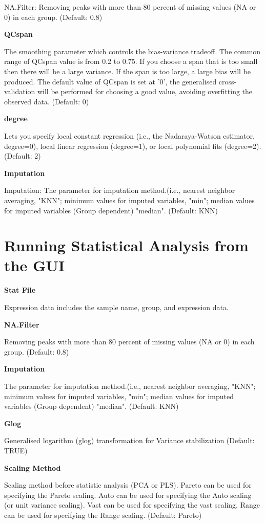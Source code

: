 \documentclass[english]{article}
\begin{document}
 NA.Filter: Removing peaks with more than 80 percent of missing values
 (NA or 0) in each group. (Default: 0.8) 


\textbf{QCspan}


The smoothing parameter which controls the bias-variance tradeoff. 
The common range of QCspan value is from 0.2 to 0.75. If you choose
a span that is too small then there will be a large variance. 
If the span is too large, a large bias will be produced. 
The default value of QCspan is set at '0', the generalised 
cross-validation will be performed for choosing a good value, 
avoiding overfitting the observed data. (Default: 0) 


\textbf{degree}


Lets you specify local constant regression (i.e., 
the Nadaraya-Watson estimator, degree=0), 
local linear regression (degree=1), or local polynomial fits (degree=2). 
(Default: 2) 


\textbf{Imputation}


Imputation: The parameter for imputation method.(i.e., 
nearest neighbor averaging, "KNN"; minimum values for imputed variables, 
"min"; median values for imputed variables (Group dependent) "median". 
(Default: KNN) 
 


\section[Running Statistical Analysis from the GUI]{
Running Statistical Analysis from the GUI}


\textbf{Stat File}


Expression data includes the sample name, group, and expression data.


\textbf{NA.Filter}


Removing peaks with more than 80 percent of missing values (NA or 0) 
in each group. (Default: 0.8) 


\textbf{Imputation}


The parameter for imputation method.(i.e., nearest neighbor averaging, 
"KNN"; minimum values for imputed variables, "min";
median values for imputed variables (Group dependent) "median". (Default: KNN)


\textbf{Glog}


Generalised logarithm (glog) transformation for Variance stabilization  
(Default: TRUE)


\textbf{Scaling Method}


Scaling method before statistic analysis (PCA or PLS). 
Pareto can be used for specifying the Pareto scaling. 
Auto can be used for specifying the Auto scaling (or unit variance scaling). 
Vast can be used for specifying the vast scaling. Range can be used for 
specifying the Range scaling. (Default: Pareto) 
\end{document}
